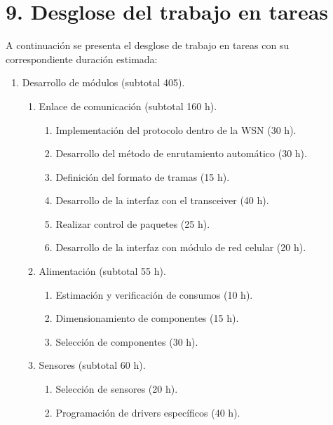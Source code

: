 \documentclass[
11pt, %
codirector, %
]{charter}
\begin{document}
\section{9. Desglose del trabajo en tareas}
\label{sec:wbs}

A continuación se presenta el desglose de trabajo en tareas con su correspondiente duración estimada:

\begin{enumerate}
\item Desarrollo de módulos (subtotal 405).

	\begin{enumerate}
	
	\item Enlace de comunicación (subtotal 160 h).
		\begin{enumerate}
			\item Implementación del protocolo dentro de la WSN (30 h).
			\item Desarrollo del método de enrutamiento automático (30 h).
			\item Definición del formato de tramas (15 h).
			\item Desarrollo de la interfaz con el transceiver (40 h).
			\item Realizar control de paquetes (25 h).
			\item Desarrollo de la interfaz con módulo de red celular (20 h).
			
		\end{enumerate}
		
	\item Alimentación (subtotal 55 h).
	
		\begin{enumerate}
			\item Estimación y verificación de consumos (10 h).
			\item Dimensionamiento de componentes (15 h).
			\item Selección de componentes (30 h).
			
		\end{enumerate}
		
	\item Sensores (subtotal 60 h).
	
		\begin{enumerate}
			\item Selección de sensores (20 h).
			\item Programación de drivers específicos (40 h).
		\end{enumerate}
	

\end{enumerate}
\end{enumerate}
\end{document}
